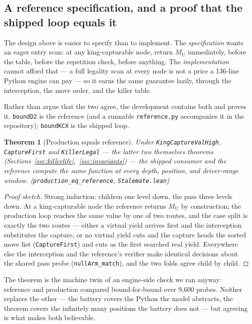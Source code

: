 \documentclass[11pt]{article}
\newcommand{\MU}{M_{\mathrm{U}}}    %
\newcommand{\leanref}[2]{(\texttt{#1}, \texttt{#2})}%
\theoremstyle{plain}
\newtheorem{theorem}{Theorem}[section]
\theoremstyle{definition}
\theoremstyle{remark}
\begin{document}
\subsection{A reference specification, and a proof that the shipped
loop equals it}

The design above is easier to specify than to implement.  The
\emph{specification} wants an eager entry scan: at any king-capturable
node, return $\MU$ immediately, before the table, before the repetition
check, before anything.  The \emph{implementation} cannot afford that
--- a full legality scan at every node is not a price a 136-line Python
engine can pay --- so it earns the same guarantee lazily, through the
interception, the move order, and the killer table.

Rather than argue that the two agree, the development contains both and
proves it.  \texttt{boundD2} is the reference (and a runnable
\texttt{reference.py} accompanies it in the repository);
\texttt{boundKCX} is the shipped loop.

\begin{theorem}[Production equals reference]
\label{thm:prodeqref}
Under \texttt{KingCaptureValHigh}, \texttt{CaptureFirst} and
\texttt{KillerLegal} --- the latter two themselves theorems
(Sections~\ref{sec:killerlife},~\ref{sec:invariants}) --- the shipped
consumer and the reference compute the \emph{same function} at every
depth, position, and driver-range window.
\leanref{production\_eq\_reference}{Stalemate.lean}
\end{theorem}

\begin{proof}[Proof sketch]
Strong induction: children one level down, the pass three levels down.
At a king-capturable node the reference returns $\MU$ by construction;
the production loop reaches the same value by one of two routes, and
the case split is exactly the two routes --- either a virtual yield
arrives first and the interception substitutes the capture, or no
virtual yield cuts and the capture heads the sorted move list
(\texttt{CaptureFirst}) and cuts as the first searched real yield.
Everywhere else the interception and the reference's verifier make
identical decisions about the shared pass probe
(\texttt{nullArm\_match}), and the two folds agree child by child.
\end{proof}

The theorem is the machine twin of an engine-side check we ran anyway:
reference and production compared bound-for-bound over 9{,}600 probes.
Neither replaces the other --- the battery covers the Python the model
abstracts, the theorem covers the infinitely many positions the battery
does not --- but agreeing is what makes both believable.
\end{document}
